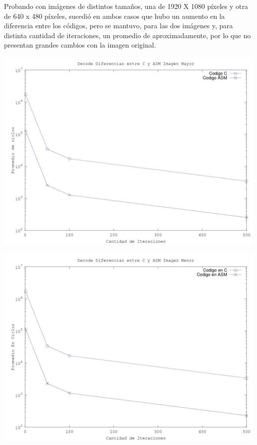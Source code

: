 Probando con im\'agenes de distintos tamaños, una de 1920 X 1080 p\'ixeles y otra de 640 x 480 p\'ixeles, sucedi\'o en ambos casos que hubo un aumento en la diferencia entre los c\'odigos, pero se mantuvo, para las dos im\'agenes y, para distinta cantidad de iteraciones, un promedio de aproximadamente, por lo que no presentan grandes cambios con la imagen original. 

\includegraphics[scale=0.7]{imagenes/DecodeMayor.jpg}

\includegraphics[scale=0.7]{imagenes/DiferenciasImagenMenor.jpg}


